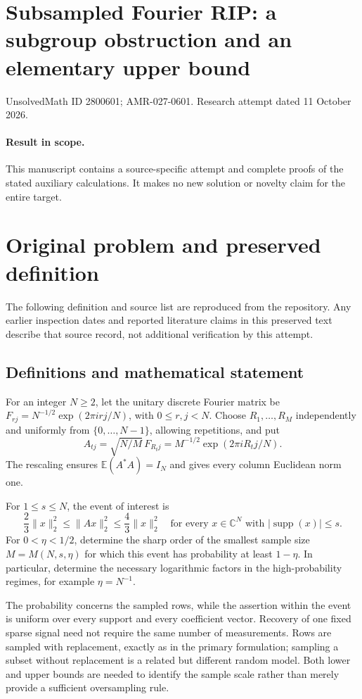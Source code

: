 \documentclass[11pt]{article}
\begin{document}
\section*{Subsampled Fourier RIP: a subgroup obstruction and an elementary upper bound}
\noindent UnsolvedMath ID 2800601; AMR-027-0601. Research attempt dated 11 October 2026.
\paragraph{Result in scope.}This manuscript contains a source-specific attempt and complete proofs of the stated auxiliary calculations. It makes no new solution or novelty claim for the entire target.
\section{Original problem and preserved definition}
The following definition and source list are reproduced from the repository. Any earlier inspection dates and reported literature claims in this preserved text describe that source record, not additional verification by this attempt.
\subsection{Definitions and mathematical statement}
For an integer $N\ge2$, let the unitary discrete Fourier matrix be
$F_{rj}=N^{-1/2}\exp(2\pi i rj/N)$, with $0\le r,j<N$.
Choose $R_1,\ldots,R_M$ independently and uniformly from
$\{0,\ldots,N-1\}$, allowing repetitions, and put
\[
 A_{tj}=\sqrt{N/M}\,F_{R_tj}
       =M^{-1/2}\exp(2\pi i R_tj/N).
\]
The rescaling ensures $\mathbb E(A^*A)=I_N$ and gives every column
Euclidean norm one.

For $1\le s\le N$, the event of interest is
\[
 \frac23\|x\|_2^2\le\|Ax\|_2^2\le\frac43\|x\|_2^2
 \quad\text{for every }x\in\mathbb C^N
       \text{ with }|\operatorname{supp}(x)|\le s.
\]
For $0<\eta<1/2$, determine the sharp order of the smallest sample
size $M=M(N,s,\eta)$ for which this event has probability at least
$1-\eta$. In particular, determine the necessary logarithmic factors
in the high-probability regimes, for example $\eta=N^{-1}$.

The probability concerns the sampled rows, while the assertion within
the event is uniform over every support and every coefficient vector.
Recovery of one fixed sparse signal need not require the same number
of measurements. Rows are sampled with replacement, exactly as in
the primary formulation; sampling a subset without replacement is a
related but different random model. Both lower and upper bounds are
needed to identify the sample scale rather than merely provide a
sufficient oversampling rule.
\end{document}
